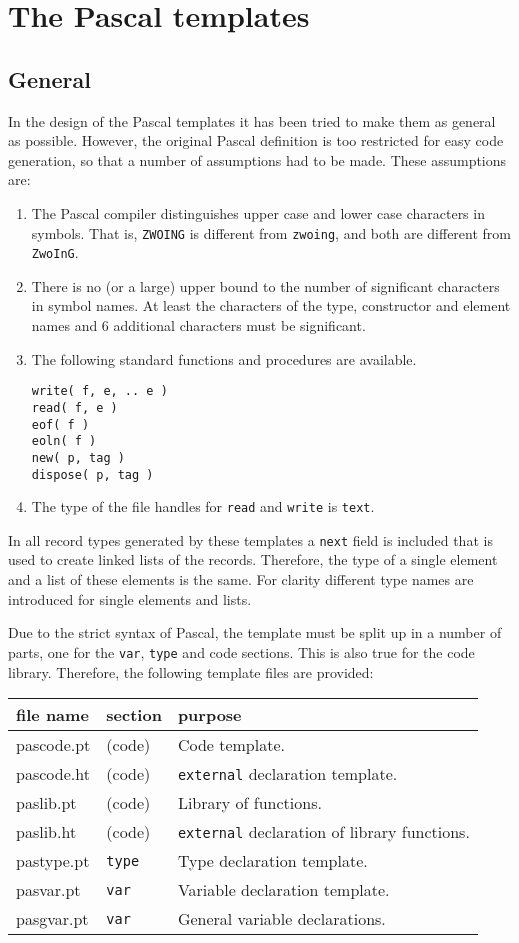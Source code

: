 \documentclass{article}
\newcommand{\Pascal}{\sf Pascal}
\begin{document}
\section{The Pascal templates}
\label{s.templates}
\subsection{General}
In the design of the {\Pascal} templates it has been tried to make
them as general as possible.
However, the original {\Pascal} definition is too restricted for
easy code generation,
so that a number of assumptions had to be made.
These assumptions are:
\begin{enumerate}
\item
The {\Pascal} compiler distinguishes upper case and lower case characters
in symbols.
That is,
{\tt ZWOING} is different from {\tt zwoing},
and both are different from {\tt ZwoInG}.
\item
There is no (or a large) upper bound to the number of significant characters
in symbol names.
At least the characters of the type, constructor and element names
and 6 additional characters must be significant.
\item
The following standard functions and procedures are available.
\begin{verbatim}
write( f, e, .. e )
read( f, e )
eof( f )
eoln( f )
new( p, tag )
dispose( p, tag )
\end{verbatim}
\item
The type of the file handles for {\tt read} and {\tt write} is {\tt text}.
\end{enumerate}
\par
In all record types generated by these templates a {\tt next} field is
included that is used to create linked lists of the records.
Therefore, the type of a single element and a list of these elements is the
same.
For clarity
different type names are introduced for single elements and lists.
\par
Due to the strict syntax of {\Pascal},
the template must be split up in a number of parts,
one for the {\tt var}, {\tt type} and code sections.
This is also true for the code library.
Therefore,
the following template files are provided:
\begin{flushleft}
\begin{tabular}{lll}
file name & section & purpose \\
\hline
pascode.pt & (code) & Code template. \\
pascode.ht & (code) & {\tt external} declaration template. \\
paslib.pt & (code) & Library of functions. \\
paslib.ht & (code) & {\tt external} declaration of library functions. \\
pastype.pt & {\tt type} & Type declaration template. \\
pasvar.pt & {\tt var} & Variable declaration template. \\
pasgvar.pt & {\tt var} & General variable declarations. \\
\end{tabular}
\end{flushleft}
\end{document}
